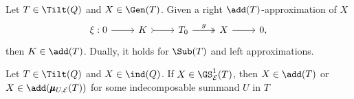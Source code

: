 \begin{lemma} \label{lem:Ibra} 
    Let $T \in \Tilt(Q)$ and $X \in \Gen(T)$. Given a right $\add(T)$-approximation of $X$ \[\begin{tikzcd}
	\xi : 0 & K & T_0  & X &  0,
	\arrow[from=1-1, to=1-2]
	\arrow[tail, from=1-2, to=1-3]
	\arrow["g",two heads,from=1-3, to=1-4]
	\arrow[from=1-4, to=1-5]
    \end{tikzcd} \]
    then $K \in \add(T)$. Dually, it holds for $\Sub(T)$ and left approximations.
\end{lemma}

\begin{lemma} \label{lem:crucialTreaching}
    Let $T \in \Tilt(Q)$ and $X \in \ind(Q)$. If $X \in \GS_\mathcal{E}^1(T)$, then $X \in \add(T)$ or $X \in \add(\pmb{\mu}_{U,\mathcal{E}}(T))$ for some indecomposable summand $U$ in $T$
\end{lemma}


